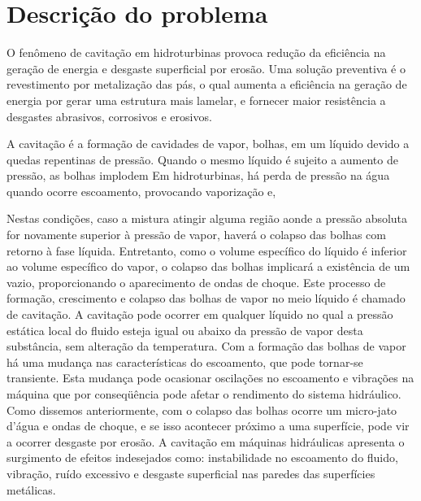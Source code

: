 \section{Descrição do problema}\label{sec:consideracoes}
O fenômeno de cavitação em hidroturbinas provoca redução da eficiência na
geração de energia e desgaste superficial por erosão. Uma solução preventiva é
o revestimento por metalização das pás, o qual aumenta a eficiência na
geração de energia por gerar uma estrutura mais lamelar, e fornecer maior
resistência a desgastes abrasivos, corrosivos e erosivos.

A cavitação é a formação de cavidades de vapor, bolhas, em um líquido devido a
quedas repentinas de pressão. Quando o mesmo líquido é sujeito a aumento de
pressão, as bolhas implodem Em hidroturbinas, há perda de pressão na água quando
ocorre escoamento, provocando vaporização e,


Nestas condições, caso a mistura atingir alguma região aonde a pressão absoluta for
novamente superior à pressão de vapor, haverá o colapso das bolhas com retorno à fase líquida.
Entretanto, como o volume específico do líquido é inferior ao volume específico do vapor, o colapso
das bolhas implicará a existência de um vazio, proporcionando o aparecimento de ondas de choque.
Este processo de formação, crescimento e colapso das bolhas de vapor no meio líquido é
chamado de cavitação. A cavitação pode ocorrer em qualquer líquido no qual a pressão estática local
do fluido esteja igual ou abaixo da pressão de vapor desta substância, sem alteração da temperatura.
Com a formação das bolhas de vapor há uma mudança nas características do escoamento, que
pode tornar-se transiente. Esta mudança pode ocasionar oscilações no escoamento e vibrações na
máquina que por conseqüência pode afetar o rendimento do sistema hidráulico. Como dissemos
anteriormente, com o colapso das bolhas ocorre um micro-jato d’água e ondas de choque, e se isso
acontecer próximo a uma superfície, pode vir a ocorrer desgaste por erosão. A cavitação em
máquinas hidráulicas apresenta o surgimento de efeitos indesejados como: instabilidade no
escoamento do fluido, vibração, ruído excessivo e desgaste superficial nas paredes das superfícies
metálicas. 

